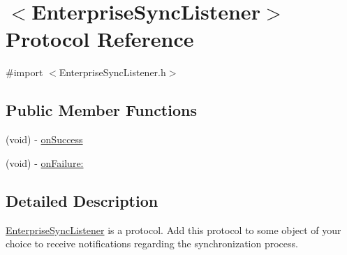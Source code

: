 \hypertarget{protocol_enterprise_sync_listener-p}{
\section{$<$EnterpriseSyncListener$>$ Protocol Reference}
\label{protocol_enterprise_sync_listener-p}
}


{\ttfamily \#import $<$EnterpriseSyncListener.h$>$}

\subsection*{Public Member Functions}
\begin{DoxyCompactItemize}
\item 
(void) -\/ \hyperlink{protocol_enterprise_sync_listener-p_a6b31d475b345931945b4fd9a862e4ff2}{onSuccess}
\item 
(void) -\/ \hyperlink{protocol_enterprise_sync_listener-p_a863baf90385b98a77dc2a6cf93b90ffa}{onFailure:}
\end{DoxyCompactItemize}


\subsection{Detailed Description}
\hyperlink{protocol_enterprise_sync_listener-p}{EnterpriseSyncListener} is a protocol. Add this protocol to some object of your choice to receive notifications regarding the synchronization process. 

